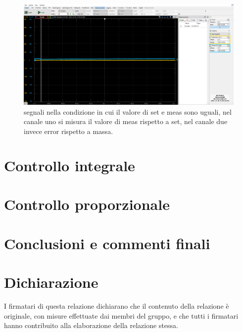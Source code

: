 \documentclass[10pt, a4paper, italian]{article}
\begin{document}
\begin{figure}[H]
    \centering
	\includegraphics[scale=0.7]{meas.same.set}
    \caption{segnali nella condizione in cui il valore di set e meas sono uguali, nel canale uno si misura il valore di meas rispetto a set, nel canale due invece error rispetto a massa.
    \label{fig: Draft1}}
\end{figure}
\section{Controllo integrale}
\section{Controllo proporzionale}
\section*{Conclusioni e commenti finali}


\section*{Dichiarazione}
I firmatari di questa relazione dichiarano che il contenuto della relazione \`e
originale, con misure effettuate dai membri del gruppo, e che tutti i firmatari
hanno contribuito alla elaborazione della relazione stessa.
\end{document}
